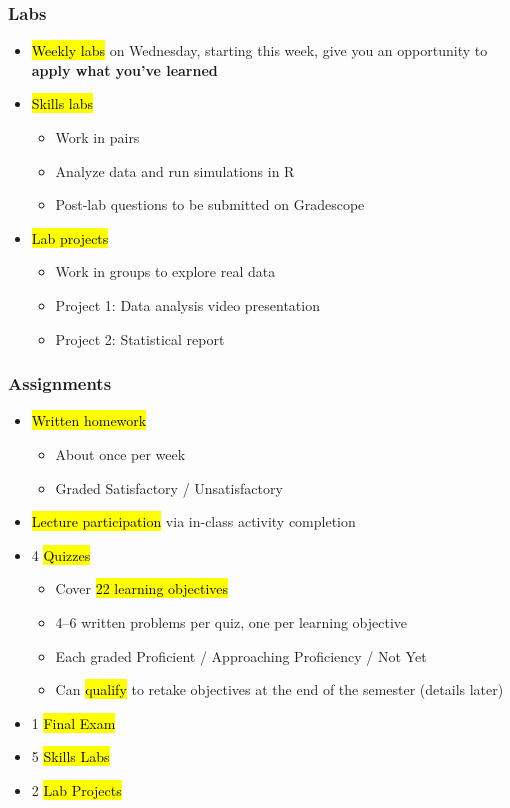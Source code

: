 \documentclass[slidestop,compress,mathserif]{beamer}
\begin{document}
\begin{frame}
	\frametitle{Labs} 
	\begin{itemize}
		\item \hl{Weekly labs} on Wednesday, starting this week, give you an opportunity to \textbf{apply what you've learned}
		\item \hl{Skills labs}
		\begin{itemize}
			\item Work in pairs
			\item Analyze data and run simulations in R
			\item Post-lab questions to be submitted on Gradescope
		\end{itemize}
		\item \hl{Lab projects}
		\begin{itemize}
			\item Work in groups to explore real data
			\item Project 1: Data analysis video presentation
			\item Project 2: Statistical report
		\end{itemize}
	\end{itemize}
\end{frame}


\begin{frame}
	\frametitle{Assignments}
	\begin{itemize}
		\item \hl{Written homework}
		\begin{itemize}
			\item About once per week
			\item Graded Satisfactory / Unsatisfactory
		\end{itemize}
		\item \hl{Lecture participation} via in-class activity completion
		\item 4 \hl{Quizzes}
		\begin{itemize}
			\item Cover \hl{22 learning objectives}
			\item 4--6 written problems per quiz, one per learning objective
			\item Each graded Proficient / Approaching Proficiency / Not Yet
			\item Can \hl{qualify} to retake objectives at the end of the semester (details later)
		\end{itemize}
		\item 1 \hl{Final Exam}
		\item 5 \hl{Skills Labs}
		\item 2 \hl{Lab Projects}
	\end{itemize}
\end{frame}
\end{document}
